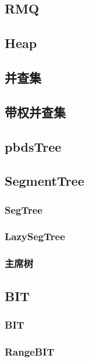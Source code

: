 \documentclass[10pt,a4paper]{article}
\begin{document}
\subsection{RMQ}

\subsection{Heap}

\subsection{并查集}

\subsection{带权并查集}

\subsection{pbdsTree}

\subsection{SegmentTree}
\subsubsection{SegTree}

\subsubsection{LazySegTree}

\subsubsection{主席树}

\subsection{BIT}
\subsubsection{BIT}

\subsubsection{RangeBIT}

\end{document}

